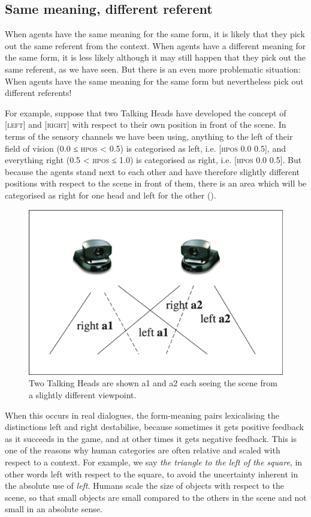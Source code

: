 \subsection{Same meaning, different referent} 

When agents have the same meaning for the same
form, it is likely that they
pick out the same referent from the context. When agents
have a different meaning for the same form, it is less 
likely although it may still happen that they pick 
out the same referent, as we have seen. But there 
is an even more problematic situation: When agents have the 
same meaning for the same form but nevertheless pick out 
different referents! 

For example, suppose that two Talking Heads have developed the 
concept of [\textsc{left}] and [\textsc{right}] with respect to their own position 
in front of the scene. In terms of the sensory 
channels we have been using, anything to the left of their field  
of vision (0.0 ≤ \textsc{hpos} < 0.5) is categorised as
left, i.e. [\textsc{hpos} 0.0 0.5], and everything right  
(0.5 < \textsc{hpos} ≤ 1.0) is categorised as right, 
i.e. [\textsc{hpos} 0.0 0.5]. But because the
agents stand next to each other and have therefore 
slightly different positions with respect to the 
scene in front of them, there is an area which will 
be categorised as right for one head and left for the other ().

\begin{figure}[htbp]
  \centerline{\includegraphics[width=.65\textwidth]{chap2/figs/left-right.pdf}}
\caption{\label{2:left-right}Two Talking Heads are shown {\bfshape a1} and 
{\bfshape a2} each seeing the scene from a slightly different viewpoint.}
\end{figure}
When this occurs in real dialogues, the form-meaning 
pairs lexicalising the distinctions left and right destabilise,
because sometimes it gets positive feedback as 
it succeeds in the game, and at other times it 
gets negative feedback. 
This is one of the reasons why human categories are often 
relative and scaled with respect to a context.
For example, we say \textit{the triangle to the left of the square}, in 
other words left with respect to the square, to avoid the uncertainty
inherent in the absolute use of \textit{left}. Humans scale the size 
of objects with respect to the scene, so that small 
objects are small compared to the others in the scene 
and not small in an absolute sense. 

